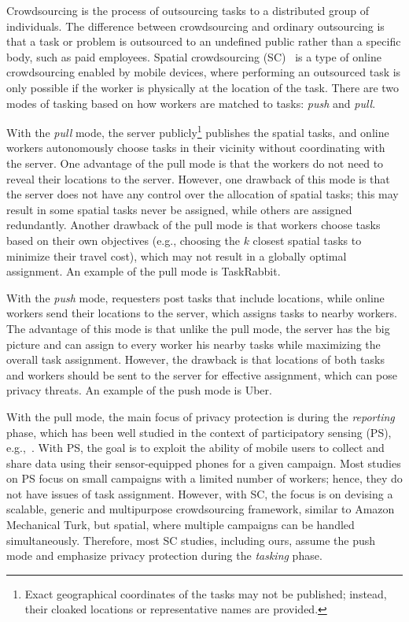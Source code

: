 \documentclass{USC-Thesis}
\numberwithin{equation}{chapter}
\begin{document}
Crowdsourcing is the process of outsourcing tasks to a distributed group of individuals. The difference
between crowdsourcing and ordinary outsourcing is that a task or problem is outsourced to an undefined
public rather than a specific body, such as paid employees.
Spatial crowdsourcing (SC)~\cite{kazemi2012geocrowd} is a type of online crowdsourcing enabled by mobile devices, where performing an outsourced task is only possible if the worker is physically at the location of the task. There are two modes of tasking based on how workers are matched to tasks: \emph{push} and \emph{pull}.

With the \emph{pull} mode, the server publicly\footnote{Exact geographical coordinates of the tasks may not be published; instead, their cloaked locations or representative names are provided.} publishes the spatial tasks, and online workers autonomously choose tasks in their vicinity without coordinating with the server. One advantage of the pull mode is that the workers do not need to reveal their locations to the server. However, one drawback of this mode is that the server does not have any control over the allocation of spatial tasks; this may result in some spatial tasks never be assigned, while others are assigned redundantly. Another drawback of the pull mode is that workers choose tasks based on their own objectives (e.g., choosing the $k$ closest spatial tasks to minimize their travel cost), which may not result in a globally optimal assignment. An example of the pull mode is TaskRabbit.

With the \emph{push} mode, requesters post tasks that include locations, while online workers send their locations to the server, which assigns tasks to nearby workers. The advantage of this mode is that unlike the pull mode, the server has the big picture and can assign to every worker his nearby tasks while maximizing the overall task assignment. However, the drawback is that locations of both tasks and workers should be sent to the server for effective assignment, which can pose privacy threats. An example of the push mode is Uber.

With the pull mode, the main focus of privacy protection is during the \emph{reporting} phase, which has been well studied in the context of participatory sensing (PS), e.g.,~\cite{Shin2011,kazemi2011privacy,Vu2012,Boutsis2013,Zhang2016}. With PS, the goal is to exploit the ability of mobile users to collect and share data using their sensor-equipped phones for a given campaign. Most studies on PS focus on small campaigns with a limited number of workers; hence, they do not have issues of task assignment. However, with SC, the focus is on devising a scalable, generic and multipurpose crowdsourcing framework, similar to Amazon Mechanical Turk, but spatial, where multiple campaigns can be handled simultaneously. Therefore, most SC studies, including ours, assume the push mode and emphasize privacy protection during the \emph{tasking} phase.
\end{document}
